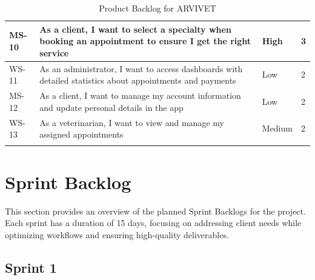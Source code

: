 \documentclass[a4paper,12pt]{report}
\begin{document}
\begin{longtable}{|p{2cm}|p{8cm}|p{3cm}|p{3cm}|}
		\hline
		MS-10 & As a client, I want to select a specialty when booking an appointment to ensure I get the right service & High & 3 \\
		\hline
		WS-11 & As an administrator, I want to access dashboards with detailed statistics about appointments and payments & Low & 2 \\
		\hline
		MS-12 & As a client, I want to manage my account information and update personal details in the app & Low & 2 \\
		\hline
		WS-13 & As a veterinarian, I want to view and manage my assigned appointments & Medium & 2 \\
		\hline
		\caption{Product Backlog for ARVIVET 
			\label{tab:arvivet_product_backlog}}
	\end{longtable}
	
	
	\clearpage
	
	\section{Sprint Backlog}
	
	This section provides an overview of the planned Sprint Backlogs for the project. Each sprint has a duration of 15 days, focusing on addressing client needs while optimizing workflows and ensuring high-quality deliverables.
	
	\subsection{Sprint 1}
	
\end{document}
